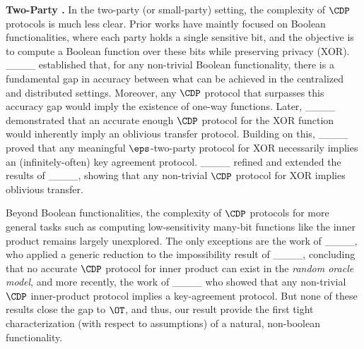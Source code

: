 \textbf{Two-Party \CDP.} In the two-party (or small-party) setting, the complexity of $\CDP$ protocols is much less clear. Prior works have maintly focused on Boolean functionalities, where each party holds a single sensitive bit, and the objective is to compute a Boolean function over these bits while preserving privacy (\eg XOR). ____ established that, for any non-trivial Boolean functionality, there is a fundamental gap in accuracy between what can be achieved in the centralized and distributed settings. Moreover, any $\CDP$ protocol that surpasses this accuracy gap would imply the existence of one-way functions. Later, ____ demonstrated that an accurate enough $\CDP$ protocol for the XOR function would inherently imply an oblivious transfer protocol. Building on this, ____ proved that any meaningful $\eps$-\CDP two-party protocol for XOR necessarily implies an (infinitely-often) key agreement protocol. ____ refined and extended the results of ____, showing that any non-trivial $\CDP$ protocol for XOR implies oblivious transfer.

Beyond Boolean functionalities, the complexity of $\CDP$ protocols for more general tasks such as computing low-sensitivity many-bit functions like the inner product remains largely unexplored. The only exceptions are the work of ____, who applied a generic reduction to the impossibility result of ____, concluding that no accurate $\CDP$ protocol for inner product can exist in the \textit{random oracle model}, and more recently, the work of ____ who showed that any non-trivial $\CDP$ inner-product protocol implies a key-agreement protocol. But none of these results close the gap to $\OT$, and thus, our result provide the first tight characterization (with respect to assumptions) of a natural, non-boolean functionality.